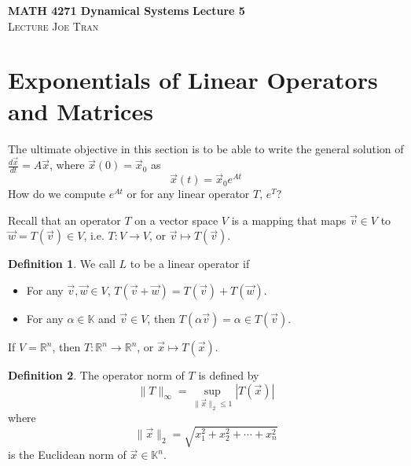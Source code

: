\documentclass[11pt]{article}
\theoremstyle{definition}\newtheorem{definition}{Definition}
\theoremstyle{definition}\newtheorem{notation}{Notation}
\theoremstyle{definition}\newtheorem{example}{Example}
\theoremstyle{theorem}\newtheorem{theorem}{Theorem}
\theoremstyle{theorem}\newtheorem{corollary}{Corollary}
\theoremstyle{theorem}\newtheorem{proposition}{Proposition}
\theoremstyle{theorem}\newtheorem{lemma}{Lemma}
\theoremstyle{theorem}\newtheorem{question}{Question}
\theoremstyle{remark}\newtheorem{remark}{Remark}
\newcommand{\K}{\mathbb{K}}
\newcommand{\R}{\mathbb{R}}
\begin{document}
\noindent \textbf{MATH 4271 Dynamical Systems} \hfill \textbf{Lecture 5} \\
\textsc{Lecture} \hfill \textsc{Joe Tran}

\section{Exponentials of Linear Operators and Matrices}

The ultimate objective in this section is to be able to write the general solution of $\frac{d\vec{x}}{dt} = A\vec{x}$, where $\vec{x}(0) = \vec{x}_0$ as
\begin{equation*}
    \vec{x}(t) = \vec{x}_0e^{At}
\end{equation*}
How do we compute $e^{At}$ or for any linear operator $T$, $e^T$?

Recall that an operator $T$ on a vector space $V$ is a mapping that maps $\vec{v} \in V$ to $\vec{w} = T(\vec{v}) \in V$, i.e. $T : V \to V$, or $\vec{v} \mapsto T(\vec{v})$.

\begin{definition}
    We call $L$ to be a linear operator if
    \begin{itemize}
        \item For any $\vec{v}, \vec{w} \in V$, $T(\vec{v} + \vec{w}) = T(\vec{v}) + T(\vec{w})$.
        \item For any $\alpha \in \K$ and $\vec{v} \in V$, then $T(\alpha \vec{v}) = \alpha \in T(\vec{v})$.
    \end{itemize}
\end{definition}

If $V = \R^n$, then $T : \R^n \to \R^n$, or $\vec{x} \mapsto T(\vec{x})$.

\begin{definition}
    The operator norm of $T$ is defined by
    \begin{equation*}
        \|T\|_{\infty} = \sup_{\|\vec{x}\|_2 \leq 1} |T(\vec{x})|
    \end{equation*}
    where
    \begin{equation*}
        \|\vec{x}\|_2 = \sqrt{x_1^2 + x_2^2 + \cdots + x_n^2}
    \end{equation*}
    is the Euclidean norm of $\vec{x} \in \K^n$.
\end{definition}
\end{document}
